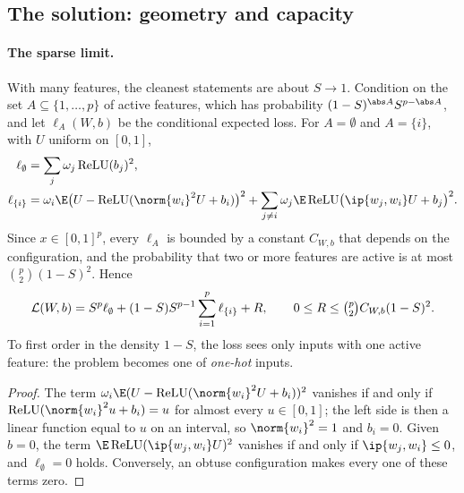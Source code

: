 \begin{refsection}
\section{The solution: geometry and capacity}\label{sec:superposition:geometry}

\paragraph{The sparse limit.} With many features, the cleanest statements are about $S\to1$. Condition on the set $A\subseteq\{1,\dots,p\}$ of active features, which has probability $(1-S)^{\abs A}S^{p-\abs A}$, and let $\ell_A(W,b)$ be the conditional expected loss. For $A=\emptyset$ and $A=\{i\}$, with $U$ uniform on $[0,1]$,
\begin{align*}
  \ell_\emptyset&=\sum_j\omega_j\relu(b_j)^2,\\
  \ell_{\{i\}}&=\omega_i\E\bigl(U-\relu(\norm{w_i}^2U+b_i)\bigr)^2+\sum_{j\ne i}\omega_j\E\relu\bigl(\ip{w_j,w_i}U+b_j\bigr)^2 .
\end{align*}
Since $x\in[0,1]^p$, every $\ell_A$ is bounded by a constant $C_{W,b}$ that depends on the configuration, and the probability that two or more features are active is at most $\binom p2(1-S)^2$. Hence
\begin{equation}\label{eq:superposition:expansion}
  \mathcal{L}(W,b)=S^p\ell_\emptyset+(1-S)S^{p-1}\sum_{i=1}^p\ell_{\{i\}}+R,\qquad 0\le R\le\tbinom p2C_{W,b}(1-S)^2 .
\end{equation}
To first order in the density $1-S$, the loss sees only inputs with one active feature: the problem becomes one of \emph{one-hot} inputs.



\begin{proof}
The term $\omega_i\E(U-\relu(\norm{w_i}^2U+b_i))^2$ vanishes if and only if $\relu(\norm{w_i}^2u+b_i)=u$ for almost every $u\in[0,1]$; the left side is then a linear function equal to $u$ on an interval, so $\norm{w_i}^2=1$ and $b_i=0$. Given $b=0$, the term $\E\relu(\ip{w_j,w_i}U)^2$ vanishes if and only if $\ip{w_j,w_i}\le0$, and $\ell_\emptyset=0$ holds. Conversely, an obtuse configuration makes every one of these terms zero.
\end{proof}


\end{refsection}

